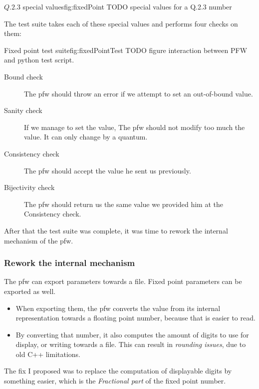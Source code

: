 \begin{figureGraphics}{$Q.2.3$ special values}{fig:fixedPoint}
    TODO special values for a Q.2.3 number
\end{figureGraphics}

The test suite takes each of these special values and performs four checks on
them:

\begin{figureGraphics}{Fixed point test suite}{fig:fixedPointTest}
    TODO figure interaction between PFW and python test script.
\end{figureGraphics}

\begin{description}
    \item[Bound check] The \gls{pfw} should throw an error if we
        attempt to set an out-of-bound value.
    \item[Sanity check] If we manage to set the value, The \gls{pfw} should not modify too much
        the value. It can only change by a quantum.
    \item[Consistency check] The \gls{pfw} should accept the value he sent us previously.
    \item[Bijectivity check] The \gls{pfw} should return us the same value we provided him at the Consistency check.
\end{description}

After that the test suite was complete, it was time to rework the internal
mechanism of the \gls{pfw}.

\subsubsection{Rework the internal mechanism}
The \gls{pfw} can export parameters towards a file. Fixed
point parameters can be exported as well.
\begin{itemize}
    \item When exporting them, the \gls{pfw} converts the value from
        its internal representation towards a floating point number, because that is
        easier to read.
    \item By converting that number, it also computes the amount of digits
        to use for display, or writing towards a file. This can result in
        \emph{rounding issues}, due to old C++ limitations.
\end{itemize}
The fix I proposed was to replace the computation of displayable digits by something
easier, which is the \emph{Fractional part} of the fixed point number.


